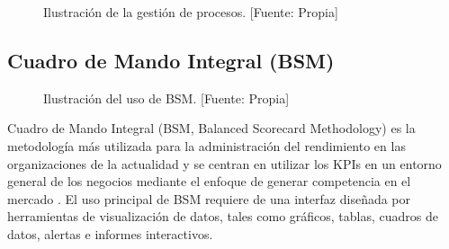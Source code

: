 \documentclass[11pt,titlepage]{report}
\begin{document}
\begin{figure}[h]
	\centering
	\caption{Ilustración de la gestión de procesos. [Fuente: Propia]} \label{fig: KPIs}	
\end{figure} 


\subsection{Cuadro de Mando Integral (BSM)}

\begin{figure}
	\caption{Ilustración del uso de BSM. [Fuente: Propia]}
	\label{fig: starnet}
\end{figure}

Cuadro de Mando Integral (BSM, Balanced Scorecard Methodology) es la metodología más utilizada para la administración del rendimiento en las organizaciones de la actualidad y se centran en utilizar los KPIs en un entorno general de los negocios mediante el enfoque de generar competencia en el mercado \cite{lib02}. El uso principal de BSM requiere de una interfaz diseñada por herramientas de visualización de datos, tales como gráficos, tablas, cuadros de datos, alertas e informes interactivos.\\
\end{document}
